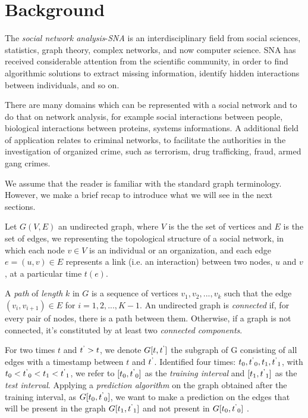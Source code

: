 \section{Background}
\label{sec:background}
The \textit{social network analysis}-\textit{SNA} is an interdisciplinary field from social sciences, statistics, graph theory, complex networks, and now computer science. SNA has received considerable attention from the scientific community, in order to find algorithmic solutions to extract missing information, identify hidden interactions between individuals, and so on. 

There are many domains which can be represented with a social network and to do that on network analysis, for example social interactions between people, biological interactions between proteins, systems informations. A additional field of application relates to criminal networks, to facilitate the authorities in the investigation of organized crime, such as terrorism, drug trafficking, fraud, armed gang crimes\cite{Xu}.

We assume that the reader is familiar with the standard graph terminology. However, we make a brief recap to introduce what we will see in the next sections.

Let $G(V,E)$ an undirected graph, where $V$ is the the set of vertices and $E$ is the set of edges, we representing the topological structure of a social network, in which each node $v \in V$ is an individual or an organization, and each edge $e=(u,v)\in E$ represents a link (i.e. an interaction) between two nodes, $u$ and $v$, at a particular time $t(e)$. 

A \textit{path} of \textit{length} $k$ in $G$ is a sequence of vertices $v_{1},v_{2},...,v_{k}$ such that the edge $(v_{i},v_{i+1}) \in E$ for $i = 1, 2,..., K-1$. An undirected graph is \textit{connected} if, for every pair of nodes, there is a path between them. Otherwise, if a graph is not connected, it's constituted by at least two \textit{connected components}.



For two times $t$ and $t\textsuperscript{'} > t$, we denote $G[t,t\textsuperscript{'}]$ the subgraph of G consisting of all edges with a timestamp between $t$ and $t\textsuperscript{'}$. Identified four times: $t_{0}, t\textsuperscript{'}_{0}, t_{1}, t\textsuperscript{'}_{1}$, with $t_{0}<t\textsuperscript{'}_{0}<t_{1}<t\textsuperscript{'}_{1}$, we refer to $[t_{0},t\textsuperscript{'}_{0}]$ as the \textit{training interval} and $[t_{1},t\textsuperscript{'}_{1}]$ as the \textit{test interval}. Applying a \textit{prediction algorithm} on the graph obtained after the training interval, as $G[t_{0},t\textsuperscript{'}_{0}]$, we want to make a prediction on the edges that will be present in the graph $G[t_{1},t\textsuperscript{'}_{1}]$ and not present in $G[t_{0},t\textsuperscript{'}_{0}]$ \cite{Liben-Nowell}.



